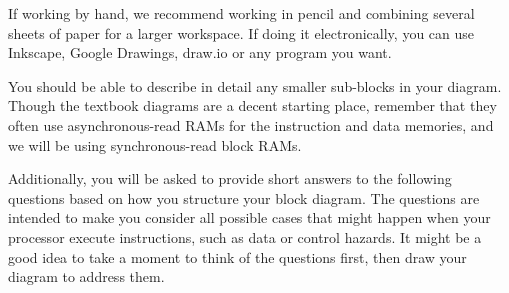 \documentclass[11pt]{article}
\begin{document}
If working by hand, we recommend working in pencil and combining several sheets of paper for a larger workspace.
If doing it electronically, you can use Inkscape, Google Drawings, draw.io or any program you want.

You should be able to describe in detail any smaller sub-blocks in your diagram.
Though the textbook diagrams are a decent starting place, remember that they often use asynchronous-read RAMs for the instruction and data memories, and we will be using synchronous-read block RAMs.

Additionally, you will be asked to provide short answers to the following questions based on how you structure your block diagram. The questions are intended to make you consider all possible cases that might happen when your processor execute instructions, such as data or control hazards. It might be a good idea to take a moment to think of the questions first, then draw your diagram to address them.
\end{document}
